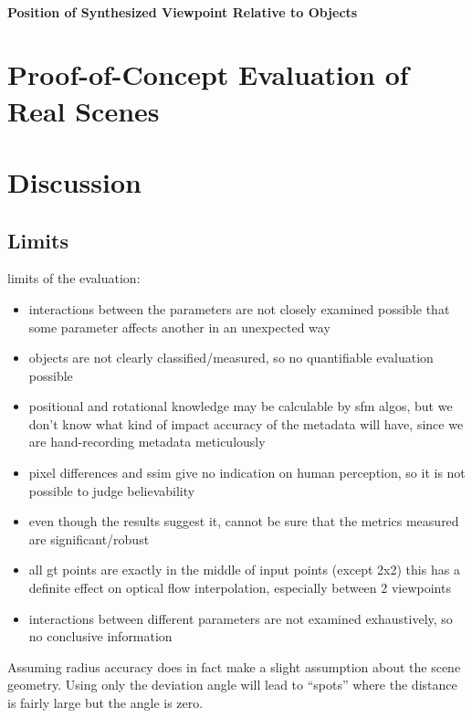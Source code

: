 \paragraph{Position of Synthesized Viewpoint Relative to Objects}

\section{Proof-of-Concept Evaluation of Real Scenes}

\section{Discussion}

\subsection{Limits}

limits of the evaluation:
\begin{itemize}
  \item interactions between the parameters are not closely examined \ar possible that some parameter affects another in an unexpected way
  \item objects are not clearly classified/measured, so no quantifiable evaluation possible
  \item positional and rotational knowledge may be calculable by sfm algos, but we don't know what kind of impact accuracy of the metadata will have, since we are hand-recording metadata meticulously
  \item pixel differences and ssim give no indication on human perception, so it is not possible to judge believability
  \item even though the results suggest it, cannot be sure that the metrics measured are significant/robust
  \item all gt points are exactly in the middle of input points (except 2x2) this has a definite effect on optical flow interpolation, especially between 2 viewpoints
  \item interactions between different parameters are not examined exhaustively, so no conclusive information
\end{itemize}

Assuming radius accuracy does in fact make a slight assumption about the scene geometry. Using only the deviation angle will lead to ``spots'' where the distance is fairly large but the angle is zero. 

